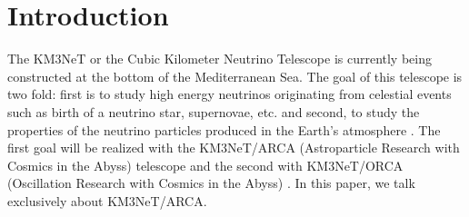 

\chapter{Introduction}

\graphicspath{{./1-introduction/figures/}}





The KM3NeT or the Cubic Kilometer Neutrino Telescope is currently being
constructed at the bottom of the Mediterranean Sea. The goal of this telescope
is two fold: first is to study high energy neutrinos originating from celestial
events such as birth of a neutrino star, supernovae, etc. and second, to study
the properties of the neutrino particles produced in the Earth's atmosphere
\cite{adrian2016letter}. The first goal will be realized with the KM3NeT/ARCA
(Astroparticle Research with Cosmics in the Abyss) telescope and the second
with KM3NeT/ORCA (Oscillation Research with Cosmics in the Abyss)
\cite{adrian2016letter}. In this paper, we talk exclusively about KM3NeT/ARCA.

